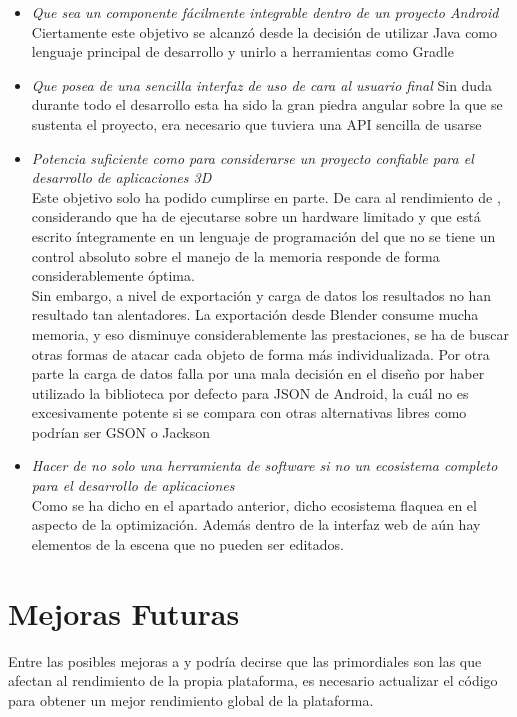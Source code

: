 \begin{itemize}
\item \textit{Que sea un componente fácilmente integrable dentro de un proyecto Android}\\
Ciertamente este objetivo se alcanzó desde la decisión de utilizar Java como lenguaje principal de desarrollo y unirlo a herramientas como Gradle\\
\item \textit{Que posea de una sencilla interfaz de uso de cara al usuario final}
Sin duda durante todo el desarrollo esta ha sido la gran piedra angular sobre la que se sustenta el proyecto, era necesario que tuviera una API sencilla de usarse
\item \textit{Potencia suficiente como para considerarse un proyecto confiable para el desarrollo de aplicaciones 3D}\\
Este objetivo solo ha podido cumplirse en parte. De cara al rendimiento de \robotto, considerando que ha de ejecutarse sobre un hardware limitado y que está escrito íntegramente en un lenguaje de programación del que no se tiene un control absoluto sobre el manejo de la memoria responde de forma considerablemente óptima.\\
Sin embargo, a nivel de exportación y carga de datos los resultados no han resultado tan alentadores. La exportación desde Blender consume mucha memoria, y eso disminuye considerablemente las prestaciones, se ha de buscar otras formas de atacar cada objeto de forma más individualizada. Por otra parte la carga de datos falla por una mala decisión en el diseño por haber utilizado la biblioteca por defecto para JSON de Android, la cuál no es excesivamente potente si se compara con otras alternativas libres como podrían ser GSON o Jackson
\item \textit{Hacer de \robotto no solo una herramienta de software si no un ecosistema completo para el desarrollo de aplicaciones}\\
Como se ha dicho en el apartado anterior, dicho ecosistema flaquea en el aspecto de la optimización. Además dentro de la interfaz web de \studio aún hay elementos de la escena que no pueden ser editados.
\end{itemize}

\section{Mejoras Futuras}
Entre las posibles mejoras a \robotto y \studio podría decirse que las primordiales son las que afectan al rendimiento de la propia plataforma, es necesario actualizar el código para obtener un mejor rendimiento global de la plataforma.\\

